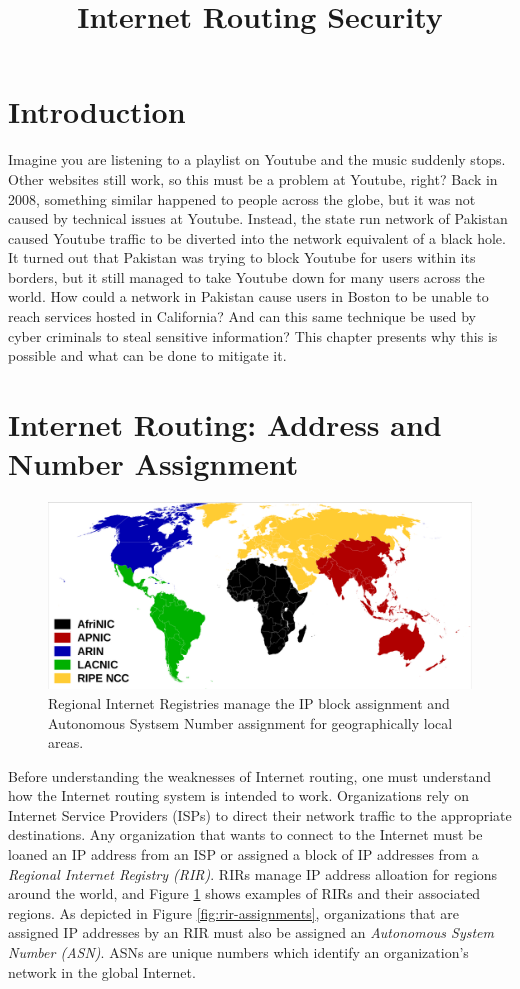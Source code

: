 \documentclass[conference]{IEEEtran}
\begin{document}
\title{Internet Routing Security}

\maketitle

\section{Introduction}
Imagine you are listening to a playlist on Youtube and the music suddenly stops.  Other websites still work, so this must be a problem at Youtube, right?  Back in 2008, something similar happened to people across the globe, but it was not caused by technical issues at Youtube.  Instead, the state run network of Pakistan caused Youtube traffic to be diverted into the network equivalent of a black hole.  It turned out that Pakistan was trying to block Youtube for users within its borders, but it still managed to take Youtube down for many users across the world.  How could a network in Pakistan cause users in Boston to be unable to reach services hosted in California?  And can this same technique be used by cyber criminals to steal sensitive information?  This chapter presents why this is possible and what can be done to mitigate it.

\section{Internet Routing: Address and Number Assignment}
\begin{figure}[b]
  \includegraphics[width=\linewidth]{images/rirs.png}
  \caption{Regional Internet Registries manage the IP block assignment and Autonomous Systsem Number assignment for geographically local areas.}
  \label{fig:rirs}
\end{figure}
Before understanding the weaknesses of Internet routing, one must understand how the Internet routing system is intended to work.  Organizations rely on Internet Service Providers (ISPs) to direct their network traffic to the appropriate destinations.  Any organization that wants to connect to the Internet must be loaned an IP address from an ISP or assigned a block of IP addresses from a \emph{Regional Internet Registry (RIR)}.  RIRs manage IP address alloation for regions around the world, and Figure \ref{fig:rirs} shows examples of RIRs and their associated regions.  As depicted in Figure \ref{fig:rir-assignments}, organizations that are assigned IP addresses by an RIR must also be assigned an \emph{Autonomous System Number (ASN)}.  ASNs are unique numbers which identify an organization's network in the global Internet.
\end{document}

